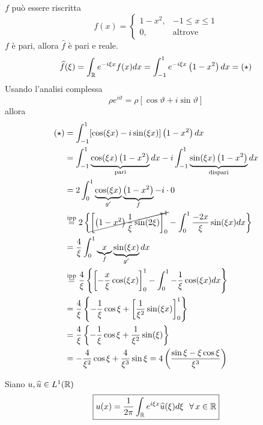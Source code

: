 $f$ può essere riscritta
\begin{equation*}
f(x) = 
\begin{cases}
1 - x^{2}, & - 1 \leq x \leq 1\\
0, & \text{altrove}
\end{cases}
\end{equation*}
$f$ è pari, allora $\hat{f}$ è pari e reale.
\begin{equation*}
\widehat{f}(\xi) = \int_{\mathbb{R}} e^{- i\xi x} f(x) dx = \int^{1}_{- 1} e^{- i\xi x}\left(1 - x^{2}\right) dx = (\star)
\end{equation*}
Usando l'analisi complessa
\begin{equation*}
\rho e^{i\vartheta} = \rho [\cos \vartheta + i\sin \vartheta ]
\end{equation*}
allora
\begin{align*}
(\star) & = \int^{1}_{- 1}[\cos(\xi x) - i\sin(\xi x)]\left(1 - x^{2}\right) dx\\
 & = \int^{1}_{- 1}\underbrace{\cos(\xi x)\left(1 - x^{2}\right)}_{\text{pari}} dx - i\int^{1}_{- 1}\underbrace{\sin(\xi x)\left(1 - x^{2}\right)}_{\text{dispari}} dx\\
 & = 2\int^{1}_{0}\underbrace{\cos(\xi x)}_{g'}\underbrace{\left(1 - x^{2}\right)}_{f} - i \cdot 0\\
 & \overset{\text{ipp}}{=} 2\left\{\cancel{\left[\left(1 - x^{2}\right)\frac{1}{\xi}\sin(2\xi)\right]^{1}_{0}} - \int^{1}_{0}\frac{- 2x}{\xi}\sin(\xi x) dx\right\}\\
 & = \frac{4}{\xi}\int^{1}_{0}\underbrace{x}_{f}\underbrace{\sin(\xi x)}_{g'} dx\\
 & \overset{\text{ipp}}{=}\frac{4}{\xi}\left\{\left[ - \frac{x}{\xi}\cos(\xi x)\right]^{1}_{0} - \int^{1}_{0} - \frac{1}{\xi}\cos(\xi x) dx\right\}\\
 & = \frac{4}{\xi}\left\{- \frac{1}{\xi}\cos \xi + \left[\frac{1}{\xi^{2}}\sin(\xi x)\right]^{1}_{0}\right\}\\
 & = \frac{4}{\xi}\left\{- \frac{1}{\xi}\cos \xi + \frac{1}{\xi^{2}}\sin(\xi)\right\}\\
 & = - \frac{4}{\xi^{2}}\cos \xi + \frac{4}{\xi^{3}}\sin \xi = 4\left(\frac{\sin \xi - \xi \cos \xi}{\xi^{3}}\right)
\end{align*}
\begin{thm}
 Siano $u, \widehat{u} \in L^{1}(\mathbb{R})$
\begin{equation*}
\boxed{u(x) = \frac{1}{2\pi}\int_{\RR} e^{i\xi x}\hat{u}(\xi) d\xi \ \ \forall x\in \RR}
\end{equation*}
\end{thm}
